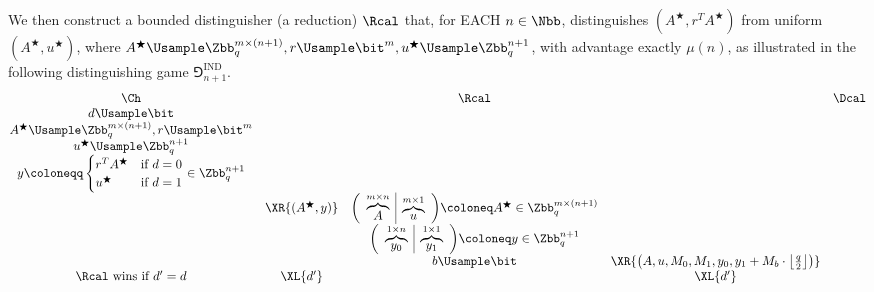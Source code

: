 \begin{answer}[ii]
    We then construct a bounded distinguisher (a reduction) $\Rcal$ that, for EACH $n\in\Nbb$, distinguishes $(A^\bigstar, r^TA^\bigstar)$ from uniform $(A^\bigstar, u^\bigstar)$, where $A^\bigstar\Usample\Zbb_q^{m\times (n+1)}, r\Usample\bit^m, u^\bigstar\Usample\Zbb_q^{n+1}$, with advantage exactly $\mu(n)$, as illustrated in the following distinguishing game $\Game^{\textrm{IND}}_{n+1}$.
    {
        \[
            \begin{array}{@{} c c c c c @{}}
            \Ch & & \Rcal & & \Dcal \\
            d\Usample\bit &&&&\\
            A^\bigstar\Usample\Zbb_q^{m\times (n+1)}, r\Usample\bit^m &&&&\\
            u^\bigstar\Usample\Zbb_q^{n+1} &&&&\\
            y\coloneqq \begin{cases}
                r^T A^\bigstar & \textrm{if } d=0\\
                u^\bigstar\ & \textrm{if } d=1
            \end{cases} \in \Zbb_q^{n+1} &&&&\\
            & \XR{(A^\bigstar, y)} & \biggl(\begin{array}{c|c}
                \overbrace{A}^{m\times n} & \overbrace{u}^{m\times 1}
            \end{array}\biggr) \coloneq A^\bigstar \in \Zbb_q^{m\times(n+1)} && \\
            &&  \biggl(\begin{array}{c|c}
                \overbrace{y_0}^{1\times n} & \overbrace{y_1}^{1\times 1}
            \end{array}\biggr) \coloneq y\in \Zbb_q^{n+1} &&\\
            && b\Usample\bit & \XR{\left(A, u, M_0, M_1, y_0, y_1 + M_b \cdot \left\lfloor\frac{q}{2}\right\rfloor\right)}&\\
            \textrm{$\Rcal$ wins if $d' = d$} & \XL{d'}  &  & \XL{d'}& \\
            \end{array}
        \]
        \label{fig:p6-game2}
    }


\end{answer}
